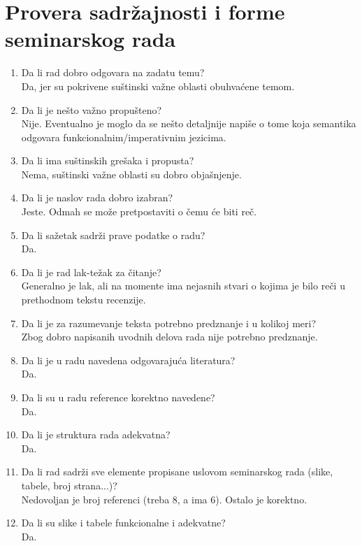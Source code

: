 \documentclass[a4paper]{report}
\begin{document}
\section{Provera sadržajnosti i forme seminarskog rada}

\begin{enumerate}
\item Da li rad dobro odgovara na zadatu temu?\\
{Da, jer su pokrivene suštinski važne oblasti obuhvaćene temom.}
\item Da li je nešto važno propušteno?\\
{Nije. Eventualno je moglo da se nešto detaljnije napiše o tome koja semantika odgovara funkcionalnim/imperativnim jezicima.}
\item Da li ima suštinskih grešaka i propusta?\\
{Nema, suštinski važne oblasti su dobro objašnjenje.}
\item Da li je naslov rada dobro izabran?\\
{Jeste. Odmah se može pretpostaviti o čemu će biti reč.}
\item Da li sažetak sadrži prave podatke o radu?\\
{Da.}
\item Da li je rad lak-težak za čitanje?\\
{Generalno je lak, ali na momente ima nejasnih stvari o kojima je bilo reči u prethodnom tekstu recenzije.}
\item Da li je za razumevanje teksta potrebno predznanje i u kolikoj meri?\\
{Zbog dobro napisanih uvodnih delova rada nije potrebno predznanje.}
\item Da li je u radu navedena odgovarajuća literatura?\\
{Da.}
\item Da li su u radu reference korektno navedene?\\
{Da.}
\item Da li je struktura rada adekvatna?\\
{Da.}
\item Da li rad sadrži sve elemente propisane uslovom seminarskog rada (slike, tabele, broj strana...)?\\
{Nedovoljan je broj referenci (treba 8, a ima 6). Ostalo je korektno.}
\item Da li su slike i tabele funkcionalne i adekvatne?\\
{Da.}
\end{enumerate}
\end{document}
